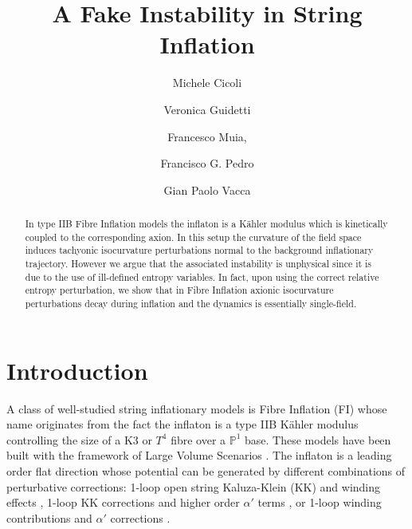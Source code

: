 \documentclass[aps,prd,a4paper,twocolumn,amsmath,showpacs,superscriptaddress,nofootinbib,preprintnumbers]{revtex4-1}
\begin{document}
\title{A Fake Instability in String Inflation}



\author{Michele Cicoli}

\author{Veronica Guidetti}

\author{Francesco Muia,}

\author{Francisco G. Pedro}

\author{Gian Paolo Vacca}





\begin{abstract}
In type IIB Fibre Inflation models the inflaton is a K\"ahler modulus which is kinetically coupled to the corresponding axion. In this setup the curvature of the field space induces tachyonic isocurvature perturbations normal to the background inflationary trajectory. However we argue that the associated instability is unphysical since it is due to the use of ill-defined entropy variables. In fact, upon using the correct relative entropy perturbation, we show that in Fibre Inflation axionic isocurvature perturbations decay during inflation and the dynamics is essentially single-field.
\end{abstract}


\maketitle

\section{Introduction}

A class of well-studied string inflationary models is Fibre Inflation (FI) whose name originates from the fact the inflaton is a type IIB K\"ahler modulus controlling the size of a K3 or $T^4$ fibre over a $\mathbb{P}^1$ base. These models have been built with the framework of Large Volume Scenarios \cite{Balasubramanian:2005zx, Cicoli:2008va}. The inflaton is a leading order flat direction whose potential can be generated by different combinations of perturbative corrections: 1-loop open string Kaluza-Klein (KK) and winding effects \cite{Cicoli:2008gp}, 1-loop KK corrections and higher order $\alpha'$ terms \cite{Broy:2015zba}, or 1-loop winding contributions and $\alpha'$ corrections \cite{Cicoli:2016chb}. 
\end{document}
